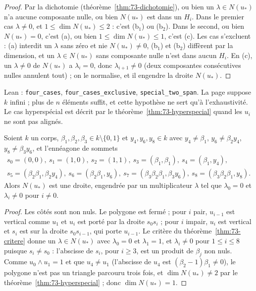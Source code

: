 \begin{proof}
Par la dichotomie (théorème~\ref{thm:73-dichotomie}), ou bien un $\lambda \in N(u_*)$ n'a aucune composante nulle, ou bien $N(u_*)$ est dans un $H_i$. Dans le premier cas $\lambda \neq 0$, et $1 \leqslant \dim N(u_*) \leqslant 2$ : c'est (b$_1$) ou (b$_2$). Dans le second, ou bien $N(u_*) = 0$, c'est (a), ou bien $1 \leqslant \dim N(u_*) \leqslant 1$, c'est (c). Les cas s'excluent : (a) interdit un $\lambda$ sans zéro et nie $N(u_*) \neq 0$, (b$_1$) et (b$_2$) diffèrent par la dimension, et un $\lambda \in N(u_*)$ sans composante nulle n'est dans aucun $H_i$. En (c), un $\lambda \neq 0$ de $N(u_*)$ a $\lambda_i = 0$, donc $\lambda_{i+1} \neq 0$ (deux composantes consécutives nulles annulent tout) ; on le normalise, et il engendre la droite $N(u_*)$.
\end{proof}

Lean : \texttt{four\_cases}, \texttt{four\_cases\_exclusive}, \texttt{special\_two\_span}. La page suppose $k$ infini ; plus de $n$ éléments suffit, et cette hypothèse ne sert qu'à l'exhaustivité. Le cas hyperspécial est décrit par le théorème~\ref{thm:73-hyperspecial} quand les $u_i$ ne sont pas alignés.

\begin{encadre}
\begin{theoreme}\label{thm:73-enneagone}
Soient $k$ un corps, $\beta_1, \beta_2, \beta_3 \in k \setminus \{0, 1\}$ et $y_4, y_6, y_8 \in k$ avec $y_4 \neq \beta_1$, $y_6 \neq \beta_2 y_4$, $y_8 \neq \beta_3 y_6$, et l'ennéagone de sommets
\[ \begin{gathered} s_0 = (0,0),\ s_1 = (1,0),\ s_2 = (1,1),\ s_3 = (\beta_1, \beta_1),\ s_4 = (\beta_1, y_4),\\ s_5 = (\beta_2\beta_1, \beta_2 y_4),\ s_6 = (\beta_2\beta_1, y_6),\ s_7 = (\beta_3\beta_2\beta_1, \beta_3 y_6),\ s_8 = (\beta_3\beta_2\beta_1, y_8). \end{gathered} \]
Alors $N(u_*)$ est une droite, engendrée par un multiplicateur $\lambda$ tel que $\lambda_0 = 0$ et $\lambda_i \neq 0$ pour $i \neq 0$.
\end{theoreme}
\end{encadre}

\begin{proof}
Les côtés sont non nuls. Le polygone est fermé ; pour $i$ pair, $u_{i-1}$ est vertical comme $u_1$ et $u_i$ est porté par la droite $s_0s_i$ ; pour $i$ impair, $u_i$ est vertical et $s_i$ est sur la droite $s_0s_{i-1}$, qui porte $u_{i-1}$. Le critère du théorème~\ref{thm:73-critere} donne un $\lambda \in N(u_*)$ avec $\lambda_0 = 0$ et $\lambda_1 = 1$, et $\lambda_i \neq 0$ pour $1 \leqslant i \leqslant 8$ puisque $s_i \neq s_0$ : l'abscisse de $s_i$, pour $i \geqslant 3$, est un produit de $\beta_j$ non nuls. Comme $u_0 \wedge u_1 = 1$ et que $u_4 \neq u_1$ (l'abscisse de $u_4$ est $(\beta_2 - 1)\beta_1 \neq 0$), le polygone n'est pas un triangle parcouru trois fois, et $\dim N(u_*) \neq 2$ par le théorème~\ref{thm:73-hyperspecial} ; donc $\dim N(u_*) = 1$.
\end{proof}

